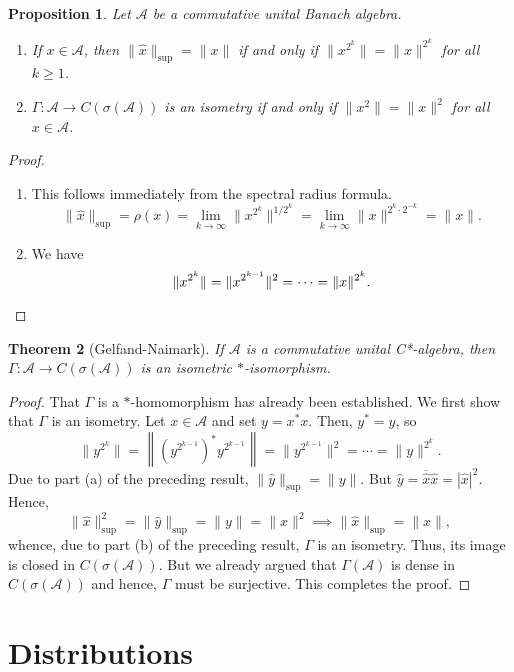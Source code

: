 \documentclass[12pt]{article}
\theoremstyle{thmstyle}
\newtheorem{theorem}{Theorem}[section]
\newtheorem{proposition}[theorem]{Proposition}
\theoremstyle{defstyle}
\newcommand{\calA}{\mathcal{A}} %
\newcommand{\wh}[1]{\widehat{#1}}
\renewcommand{\ge}{\geqslant}
\begin{document}
\begin{proposition}
    Let $\calA$ be a commutative unital Banach algebra. 
    \begin{enumerate}[label=(\alph*)]
    \item If $x\in\calA$, then $\|\wh x\|_{\sup} = \|x\|$ if and only if $\|x^{2^k}\| = \|x\|^{2^k}$ for all $k\ge 1$. 
    \item $\Gamma:\calA\to C(\sigma(\calA))$ is an isometry if and only if $\|x^2\| = \|x\|^2$ for all $x\in\calA$.
    \end{enumerate}
\end{proposition}
\begin{proof}
\begin{enumerate}[label=(\alph*)]
    \item This follows immediately from the spectral radius formula. 
    \begin{equation*}
        \|\wh x\|_{\sup} = \rho(x) = \lim_{k\to\infty}\|x^{2^k}\|^{1/2^k} = \lim_{k\to\infty}\|x\|^{2^k\cdot 2^{-k}} = \|x\|.
    \end{equation*}
    \item We have
    \begin{equation*}
        \|x^{2^k}\| = \|x^{2^{k - 1}}\|^2 = \cdots = \|x\|^{2^k}. \qedhere
    \end{equation*}
\end{enumerate}
\end{proof}

\begin{theorem}[Gelfand-Naimark]
    If $\calA$ is a commutative unital C*-algebra, then $\Gamma:\calA\to C(\sigma(\calA))$ is an isometric $\ast$-isomorphism.
\end{theorem}
\begin{proof}
    That $\Gamma$ is a $\ast$-homomorphism has already been established. We first show that $\Gamma$ is an isometry. Let $x\in\calA$ and set $y = x^\ast x$. Then, $y^\ast = y$, so 
    \begin{equation*}
        \|y^{2^k}\| = \left\|\left(y^{2^{k - 1}}\right)^\ast y^{2^{k - 1}}\right\| = \|y^{2^{k - 1}}\|^2 = \cdots = \|y\|^{2^k}.
    \end{equation*}
    Due to part (a) of the preceding result, $\|\wh y\|_{\sup} = \|y\|$. But $\wh y = \overline{\wh x}\wh x = |\wh x|^2$. Hence,
    \begin{equation*}
        \|\wh x\|_{\sup}^2 = \|\wh y\|_{\sup} = \|y\| = \|x\|^2\implies\|\wh x\|_{\sup} = \|x\|,
    \end{equation*}
    whence, due to part (b) of the preceding result, $\Gamma$ is an isometry. Thus, its image is closed in $C(\sigma(\calA))$. But we already argued that $\Gamma(\calA)$ is dense in $C(\sigma(\calA))$ and hence, $\Gamma$ must be surjective. This completes the proof.
\end{proof}

\section{Distributions}

\end{document}
